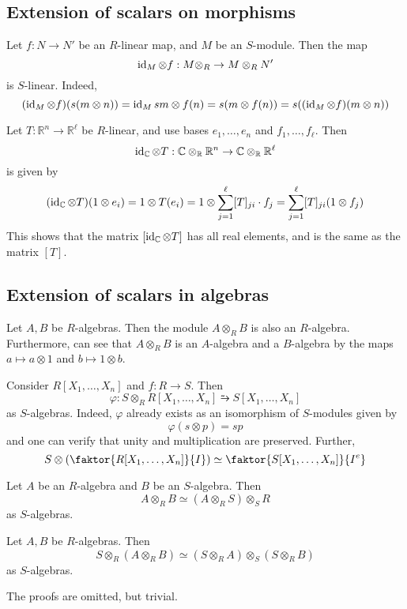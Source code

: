 \subsection{Extension of scalars on morphisms}
Let \( f : N \to N' \) be an \( R \)-linear map, and \( M \) be an \( S \)-module.
Then the map
\[ \operatorname{id}_M \otimes f : M \otimes_R \to M \otimes_R N' \]
is \( S \)-linear.
Indeed,
\[ (\operatorname{id}_M \otimes f)(s(m \otimes n)) = \operatorname{id}_M sm \otimes f(n) = s(m \otimes f(n)) = s((\operatorname{id}_M \otimes f)(m \otimes n)) \]
\begin{example}
    Let \( T : \mathbb R^n \to \mathbb R^\ell \) be \( R \)-linear, and use bases \( e_1, \dots, e_n \) and \( f_1, \dots, f_\ell \).
    Then
    \[ \operatorname{id}_{\mathbb C} \otimes T : \mathbb C \otimes_{\mathbb R} \mathbb R^n \to \mathbb C \otimes_{\mathbb R} \mathbb R^\ell \]
    is given by
    \[ (\operatorname{id}_{\mathbb C} \otimes T)(1 \otimes e_i) = 1 \otimes T(e_i) = 1 \otimes \sum_{j=1}^\ell [T]_{ji} \cdot f_j = \sum_{j=1}^\ell [T]_{ji} (1 \otimes f_j) \]
    This shows that the matrix \( [\operatorname{id}_{\mathbb C} \otimes T] \) has all real elements, and is the same as the matrix \( [T] \).
\end{example}

\subsection{Extension of scalars in algebras}
Let \( A, B \) be \( R \)-algebras.
Then the module \( A \otimes_R B \) is also an \( R \)-algebra.
Furthermore, can see that \( A \otimes_R B \) is an \( A \)-algebra and a \( B \)-algebra by the maps \( a \mapsto a \otimes 1 \) and \( b \mapsto 1 \otimes b \).
\begin{example}
    Consider \( R[X_1, \dots, X_n] \) and \( f : R \to S \).
    Then
    \[ \varphi : S \otimes_R R[X_1, \dots, X_n] \similarrightarrow S[X_1, \dots, X_n] \]
    as \( S \)-algebras.
    Indeed, \( \varphi \) already exists as an isomorphism of \( S \)-modules given by
    \[ \varphi(s \otimes p) = sp \]
    and one can verify that unity and multiplication are preserved.
    Further,
    \[ S \otimes \qty(\faktor{R[X_1, \dots, X_n]}{I}) \simeq \faktor{S[X_1, \dots, X_n]}{I^e} \]
\end{example}
\begin{proposition}
    Let \( A \) be an \( R \)-algebra and \( B \) be an \( S \)-algebra.
    Then
    \[ A \otimes_R B \simeq (A \otimes_R S) \otimes_S R \]
    as \( S \)-algebras.
\end{proposition}
\begin{proposition}
    Let \( A, B \) be \( R \)-algebras.
    Then
    \[ S \otimes_R (A \otimes_R B) \simeq (S \otimes_R A) \otimes_S (S \otimes_R B) \]
    as \( S \)-algebras.
\end{proposition}
The proofs are omitted, but trivial.


